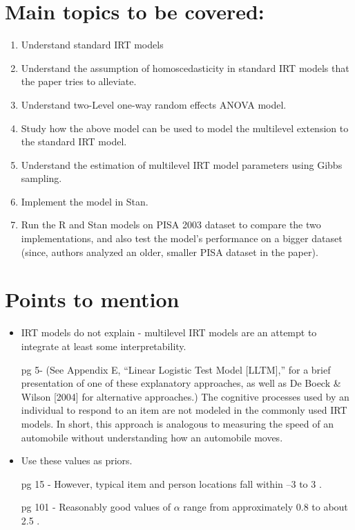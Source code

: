 \documentclass[12pt]{article}
\begin{document}
\section{Main topics to be covered:}
\begin{enumerate}[label=(\alph*)]
    \item Understand standard IRT models
    \item Understand the assumption of homoscedasticity in standard IRT models that the paper tries to alleviate.
    \item Understand two-Level one-way random effects ANOVA model.
    \item Study how the above model can be used to model the multilevel extension to the standard IRT model.
    \item Understand the estimation of multilevel IRT model parameters using Gibbs sampling.
    \item Implement the model in Stan.
    \item Run the R and Stan models on PISA 2003 dataset to compare the two implementations, and also test the model's performance on a bigger dataset (since, authors analyzed an older, smaller PISA dataset in the paper).
\end{enumerate}

\section{Points to mention}
\begin{itemize}
    \item IRT models do not explain - multilevel IRT models are an attempt to integrate at least some interpretability.
    
    pg 5- (See Appendix E, “Linear Logistic Test Model [LLTM],” for a brief presentation of one of these explanatory approaches, as well as De Boeck \& Wilson [2004] for alternative approaches.) The cognitive processes used by an individual to respond to an item are not modeled in the commonly used IRT models. In short, this approach is analogous to measuring the speed of an automobile without understanding how an automobile moves. \cite{de2013theory}
    
    \item  Use these values as priors.
    
    pg 15 - However, typical item and person locations fall within –3 to 3 \cite{de2013theory}.
    
    pg 101 - Reasonably good values of $\alpha$ range from approximately 0.8 to about 2.5 \cite{de2013theory}.
\end{itemize}
\end{document}
